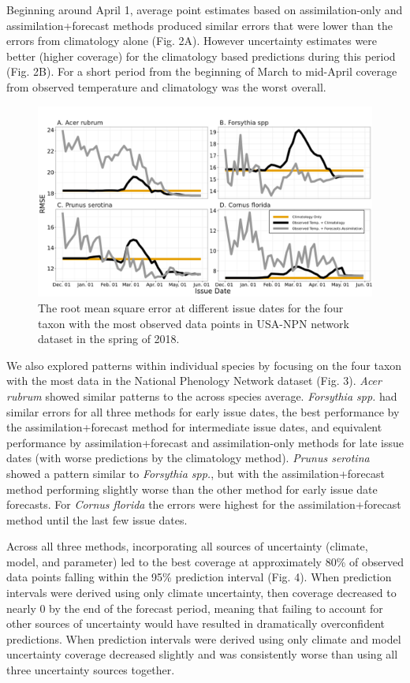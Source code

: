 \documentclass[fleqn,10pt,lineno]{wlpeerj}
\begin{document}
Beginning around April 1, average point estimates based on assimilation-only and assimilation+forecast methods produced similar errors that were lower than the errors from climatology alone (Fig. 2A). However uncertainty estimates were better (higher coverage) for the climatology based predictions during this period (Fig. 2B). For a short period from the beginning of March to mid-April coverage from observed temperature and climatology was the worst overall.

\begin{figure}[ht]
\centering
\includegraphics[width=\linewidth]{figs/fig3_abund_spp_errors.png}
\caption{The root mean square error at different issue dates for the four taxon with the most observed data points in USA-NPN network dataset in the spring of 2018.}
\label{fig3}
\end{figure}

We also explored patterns within individual species by focusing on the four taxon with the most data in the National Phenology Network dataset (Fig. 3). \textit{Acer rubrum} showed similar patterns to the across species average. \textit{Forsythia spp.} had similar errors for all three methods for early issue dates, the best performance by the assimilation+forecast method for intermediate issue dates, and equivalent performance by assimilation+forecast and assimilation-only methods for late issue dates (with worse predictions by the climatology method). \textit{Prunus serotina} showed a pattern similar to \textit{Forsythia spp.}, but with the assimilation+forecast method performing slightly worse than the other method for early issue date forecasts. For \textit{Cornus florida} the errors were highest for the assimilation+forecast method until the last few issue dates.

Across all three methods, incorporating all sources of uncertainty (climate, model, and parameter) led to the best coverage at approximately 80\% of observed data points falling within the 95\% prediction interval (Fig. 4). When prediction intervals were derived using only climate uncertainty, then coverage decreased to nearly 0 by the end of the forecast period, meaning that failing to account for other sources of uncertainty would have resulted in dramatically overconfident predictions. When prediction intervals were derived using only climate and model uncertainty coverage decreased slightly and was consistently worse than using all three uncertainty sources together.
\end{document}
